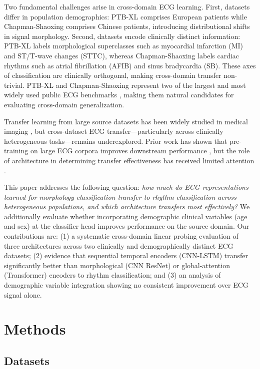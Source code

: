 \documentclass[journal]{IEEEtran}
\begin{document}
Two fundamental challenges arise in cross-domain ECG learning. First, datasets differ in population demographics: PTB-XL \cite{wagner2020ptbxl} comprises European patients while Chapman-Shaoxing \cite{zheng2020chapman} comprises Chinese patients, introducing distributional shifts in signal morphology. Second, datasets encode clinically distinct information: PTB-XL labels morphological superclasses such as myocardial infarction (MI) and ST/T-wave changes (STTC), whereas Chapman-Shaoxing labels cardiac rhythms such as atrial fibrillation (AFIB) and sinus bradycardia (SB). These axes of classification are clinically orthogonal, making cross-domain transfer non-trivial. PTB-XL and Chapman-Shaoxing represent two of the largest and most widely used public ECG benchmarks \cite{wagner2020ptbxl, zheng2020chapman}, making them natural candidates for evaluating cross-domain generalization.

Transfer learning from large source datasets has been widely studied in medical imaging \cite{raghu2019transfusion}, but cross-dataset ECG transfer---particularly across clinically heterogeneous tasks---remains underexplored. Prior work has shown that pre-training on large ECG corpora improves downstream performance \cite{mehari2022selfsupervised}, but the role of architecture in determining transfer effectiveness has received limited attention \cite{strodthoff2021ptbxl}.

This paper addresses the following question: \textit{how much do ECG representations learned for morphology classification transfer to rhythm classification across heterogeneous populations, and which architecture transfers most effectively?} We additionally evaluate whether incorporating demographic clinical variables (age and sex) at the classifier head improves performance on the source domain. Our contributions are: (1) a systematic cross-domain linear probing evaluation of three architectures across two clinically and demographically distinct ECG datasets; (2) evidence that sequential temporal encoders (CNN-LSTM) transfer significantly better than morphological (CNN ResNet) or global-attention (Transformer) encoders to rhythm classification; and (3) an analysis of demographic variable integration showing no consistent improvement over ECG signal alone.

\section{Methods}

\subsection{Datasets}
\end{document}
